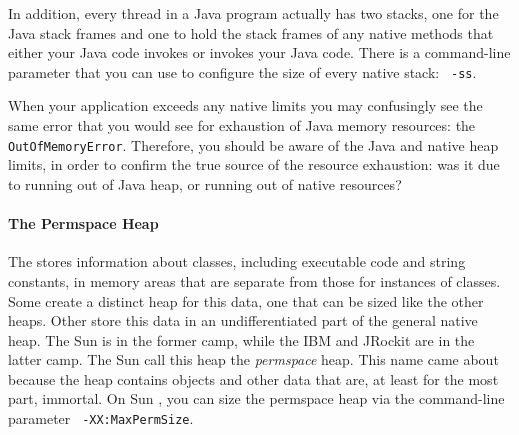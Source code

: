 In addition, every thread in a Java program actually has two stacks, one for the
Java stack frames and one to hold the stack frames of any native methods that
either your Java code invokes or invokes your Java code. There is a command-line
parameter that you can use to configure the size of every native stack: {\tt
-ss}.

When your application exceeds any native limits you may confusingly see the same
error that you would see for exhaustion of Java memory resources: the {\tt
OutOf\-Memory\-Error}. Therefore, you should be aware of the Java and native
heap limits, in order to confirm the true source of the resource exhaustion: was it
due to running out of Java heap, or running out of native resources?




\paragraph{The Permspace Heap}
The \jre stores information about classes, including executable code and string
constants, in memory areas that are separate from those for instances of
classes. Some \jres create a distinct heap for this data, one that can be sized
like the other heaps. Other \jres store this data in an undifferentiated part of
the general native heap. The Sun \jre is in the former camp, while the IBM and
JRockit \jres are in the latter camp. The Sun \jres call this heap the
\emph{permspace} heap. This name came about because the heap contains objects
and other data that are, at least for the most part, immortal. On Sun \jres, you
can size the permspace heap via the command-line parameter {\tt
-XX:MaxPermSize}.

